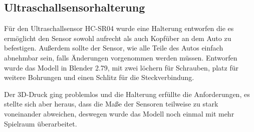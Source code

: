 \documentclass[a4paper, 12pt]{scrartcl}
\begin{document}
\subsection{Ultraschallsensorhalterung}

Für den Ultraschallsensor HC-SR04 wurde eine Halterung entworfen die es ermöglicht den Sensor sowohl aufrecht als auch Kopfüber an dem Auto zu befestigen. Außerdem sollte der Sensor, wie alle Teile des Autos einfach abnehmbar sein, falls Änderungen vorgenommen werden müssen. Entworfen wurde das Modell in Blender 2.79, mit zwei löchern für Schrauben, platz für weitere Bohrungen und einen Schlitz für die Steckverbindung.

Der 3D-Druck ging problemlos und die Halterung erfüllte die Anforderungen, es stellte sich aber heraus, dass die Maße der Sensoren teilweise zu stark voneinander abweichen, deswegen wurde das Modell noch einmal mit mehr Spielraum überarbeitet.
\end{document}
